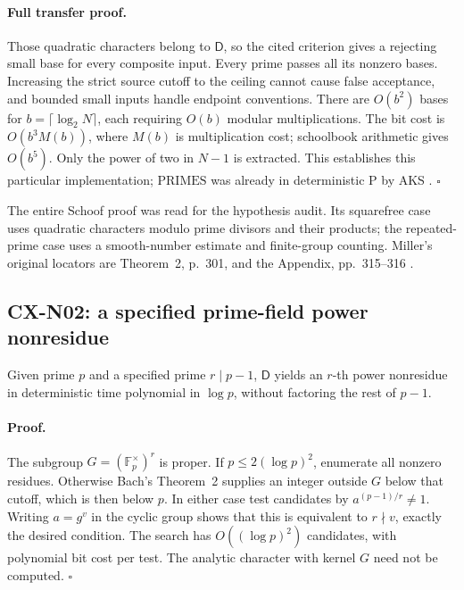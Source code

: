 \paragraph{Full transfer proof.}
Those quadratic characters belong to \(\mathsf D\), so the cited criterion
gives a rejecting small base for every composite input. Every prime passes
all its nonzero bases. Increasing the strict source cutoff to the ceiling
cannot cause false acceptance, and bounded small inputs handle endpoint
conventions. There are \(O(b^2)\) bases for \(b=\lceil\log_2N\rceil\), each
requiring \(O(b)\) modular multiplications. The bit cost is
\(O(b^3M(b))\), where \(M(b)\) is multiplication cost; schoolbook arithmetic
gives \(O(b^5)\). Only the power of two in \(N-1\) is extracted.
This establishes this particular implementation; \(\mathrm{PRIMES}\)
was already in deterministic \(\mathrm P\) by AKS \cite[Theorem~4.1 p.~785 and Theorem~5.1 p.~789]{CXNAKS04}. \(\square\)

The entire Schoof proof was read for the hypothesis audit. Its squarefree
case uses quadratic characters modulo prime divisors and their products;
the repeated-prime case uses a smooth-number estimate and finite-group
counting. Miller's original locators are Theorem~2, p.~301, and the
Appendix, pp.~315--316 \cite{CXNMiller76}.

\subsection{CX-N02: a specified prime-field power nonresidue}
\label{cx-n02}

Given prime \(p\) and a specified prime \(r\mid p-1\), \(\mathsf D\) yields
an \(r\)-th power nonresidue in deterministic time polynomial in
\(\log p\), without factoring the rest of \(p-1\).

\paragraph{Proof.}
The subgroup \(G=(\mathbb F_p^\times)^r\) is proper.
If \(p\leq2(\log p)^2\), enumerate all nonzero residues.
Otherwise Bach's Theorem~2 supplies an integer outside \(G\) below that
cutoff, which is then below \(p\). In either case test candidates by
\(a^{(p-1)/r}\ne1\). Writing \(a=g^v\) in the cyclic group shows that this
is equivalent to \(r\nmid v\), exactly the desired condition.
The search has \(O((\log p)^2)\) candidates, with polynomial bit cost per
test. The analytic character with kernel \(G\) need not be computed.
\(\square\)

